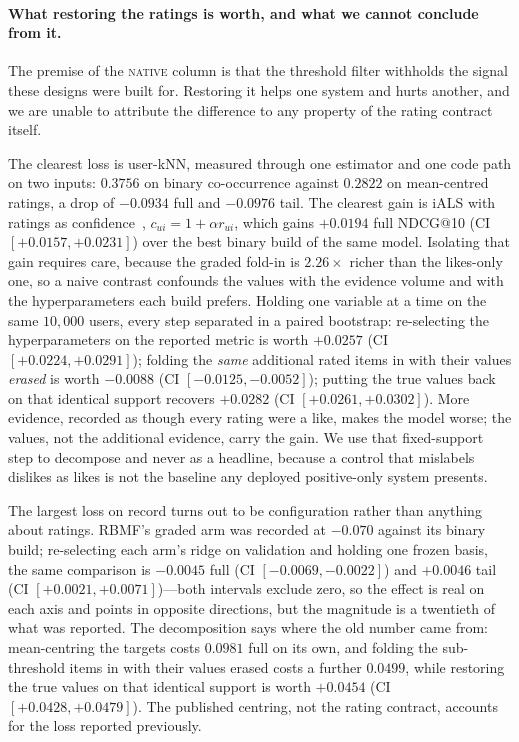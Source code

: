\documentclass[11pt]{article}
\begin{document}
\paragraph{What restoring the ratings is worth, and what we cannot conclude from it.}
The premise of the \textsc{native} column is that the threshold filter withholds the signal these designs
were built for. Restoring it helps one system and hurts another, and we are unable to attribute the
difference to any property of the rating contract itself.

The clearest loss is user-kNN, measured through one estimator and one code path on two inputs: $0.3756$ on
binary co-occurrence against $0.2822$ on mean-centred ratings, a drop of $-0.0934$ full and $-0.0976$ tail.
The clearest gain is iALS with ratings as confidence~\cite{hu2008collaborative}, $c_{ui}=1+\alpha r_{ui}$,
which gains $+0.0194$ full NDCG@10 (CI $[+0.0157,+0.0231]$) over the best binary build of the same model.
Isolating that gain requires care, because the graded fold-in is $2.26\times$ richer than the likes-only
one, so a naive contrast confounds the values with the evidence volume and with the hyperparameters each
build prefers. Holding one variable at a time on the same $10{,}000$ users, every step separated in a
paired bootstrap: re-selecting the hyperparameters on the reported metric is worth $+0.0257$
(CI $[+0.0224,+0.0291]$); folding the \emph{same} additional rated items in with their values
\emph{erased} is worth $-0.0088$ (CI $[-0.0125,-0.0052]$); putting the true values back on that identical
support recovers $+0.0282$ (CI $[+0.0261,+0.0302]$). More evidence, recorded as though every rating were a
like, makes the model worse; the values, not the additional evidence, carry the gain. We use that fixed-support step to decompose and
never as a headline, because a control that mislabels dislikes as likes is not the baseline any deployed
positive-only system presents.

The largest loss on record turns out to be configuration rather than anything about ratings. RBMF's graded
arm was recorded at $-0.070$ against its binary build; re-selecting each arm's ridge on validation and
holding one frozen basis, the same comparison is $-0.0045$ full (CI $[-0.0069,-0.0022]$) and $+0.0046$
tail (CI $[+0.0021,+0.0071]$)---both intervals exclude zero, so the effect is real on each axis and points
in opposite directions, but the magnitude is a twentieth of what was reported. The decomposition says
where the old number came from: mean-centring the targets costs $0.0981$ full on its own, and folding the
sub-threshold items in with their values erased costs a further $0.0499$, while restoring the true values
on that identical support is worth $+0.0454$ (CI $[+0.0428,+0.0479]$). The published centring, not the
rating contract, accounts for the loss reported previously.
\end{document}

